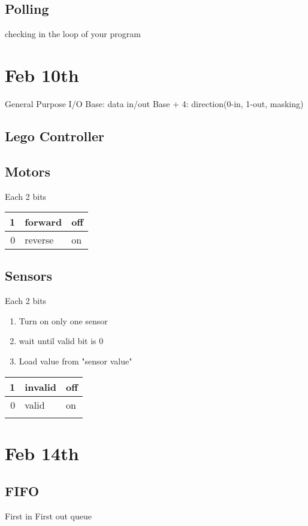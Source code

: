\documentclass[11pt]{article}
\begin{document}
\subsection{Polling}
\label{sec:orgheadline59}
checking in the loop of your program
\section{Feb 10th}
\label{sec:orgheadline64}
General Purpose I/O
Base: data in/out
Base + 4: direction(0-in, 1-out, masking)
\subsection{Lego Controller}
\label{sec:orgheadline61}
\subsection{Motors}
\label{sec:orgheadline62}
Each 2 bits
\begin{center}
\begin{tabular}{rll}
1 & forward & off\\
\hline
0 & reverse & on\\
\end{tabular}
\end{center}
\subsection{Sensors}
\label{sec:orgheadline63}
Each 2 bits
\begin{enumerate}
\item Turn on only one sensor
\item wait until valid bit is 0
\item Load value from "sensor value"
\end{enumerate}
\begin{center}
\begin{tabular}{rll}
1 & invalid & off\\
\hline
0 & valid & on\\
 &  & \\
\end{tabular}
\end{center}
\section{Feb 14th}
\label{sec:orgheadline71}
\subsection{FIFO}
\label{sec:orgheadline65}
First in First out queue
\end{document}
